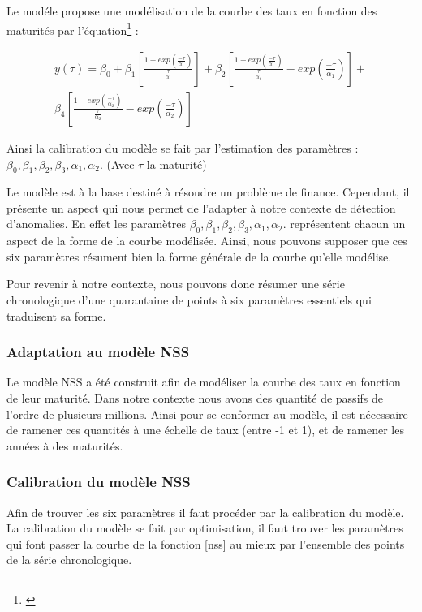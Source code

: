 Le modéle propose une modélisation de la courbe des taux en fonction des maturités par l'équation\footnote{\cite{ManfredGilli2010}} :

\begin{multline}
y(\tau)=\beta_{0}+\beta_{1}\left[\frac{1-exp(\frac{-\tau}{\alpha_{1}})}{\frac{\tau}{\alpha_{1}}}\right]+\beta_{2}\left[\frac{1-exp(\frac{-\tau}{\alpha_{1}})}{\frac{\tau}{\alpha_{1}}}-exp(\frac{-\tau}{\alpha_{1}})\right]+ \\
\beta_{4}\left[\frac{1-exp(\frac{-\tau}{\alpha_{2}})}{\frac{\tau}{\alpha_{2}}}-exp(\frac{-\tau}{\alpha_{2}})\right]
\label{nss}
\end{multline}

Ainsi la calibration du modèle se fait par l'estimation des paramètres : $ \beta_{0},\beta_{1},\beta_{2},\beta_{3},\alpha_{1},\alpha_{2}. $ (Avec $ \tau $ la maturité)

Le modèle est à la base destiné à résoudre un problème de finance. Cependant, il présente un aspect qui nous permet de l'adapter à notre contexte de détection d'anomalies. En effet les paramètres $ \beta_{0},\beta_{1},\beta_{2},\beta_{3},\alpha_{1},\alpha_{2}. $  représentent chacun un aspect de la forme de la courbe modélisée. Ainsi, nous pouvons supposer que ces six paramètres résument bien la forme générale de la courbe qu'elle modélise. 

Pour revenir à notre contexte, nous pouvons donc résumer une série chronologique d'une quarantaine de points à six paramètres essentiels qui traduisent sa forme.

\subsubsection{Adaptation au modèle NSS}

Le modèle NSS a été construit afin de modéliser la courbe des taux en fonction de leur maturité. Dans notre contexte nous avons des quantité de passifs de l'ordre de plusieurs millions. Ainsi pour se conformer au modèle, il est nécessaire de ramener ces quantités à une échelle de taux (entre -1 et 1), et de ramener les années à des maturités.

\subsubsection{Calibration du modèle NSS}

Afin de trouver les six paramètres il faut procéder par la calibration du modèle. La calibration du modèle se fait par optimisation, il faut trouver les paramètres qui font passer la courbe de la fonction \eqref{nss} au mieux par l'ensemble des points de la série chronologique. 

